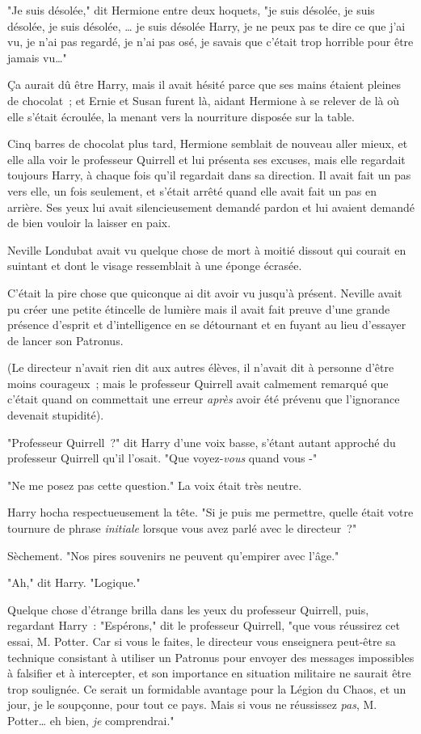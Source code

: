 "Je suis désolée," dit Hermione entre deux hoquets, "je suis désolée, je suis désolée, je suis désolée, … je suis désolée Harry, je ne peux pas te dire ce que j'ai vu, je n'ai pas regardé, je n'ai pas osé, je savais que c'était trop horrible pour être jamais vu…"

Ça aurait dû être Harry, mais il avait hésité parce que ses mains étaient pleines de chocolat~; et Ernie et Susan furent là, aidant Hermione à se relever de là où elle s'était écroulée, la menant vers la nourriture disposée sur la table.

Cinq barres de chocolat plus tard, Hermione semblait de nouveau aller mieux, et elle alla voir le professeur Quirrell et lui présenta ses excuses, mais elle regardait toujours Harry, à chaque fois qu'il regardait dans sa direction. Il avait fait un pas vers elle, un fois seulement, et s'était arrêté quand elle avait fait un pas en arrière. Ses yeux lui avait silencieusement demandé pardon et lui avaient demandé de bien vouloir la laisser en paix.

\later

Neville Londubat avait vu quelque chose de mort à moitié dissout qui courait en suintant et dont le visage ressemblait à une éponge écrasée.

C'était la pire chose que quiconque ai dit avoir vu jusqu'à présent. Neville avait pu créer une petite étincelle de lumière mais il avait fait preuve d'une grande présence d'esprit et d'intelligence en se détournant et en fuyant au lieu d'essayer de lancer son Patronus.

(Le directeur n'avait rien dit aux autres élèves, il n'avait dit à personne d'être moins courageux~; mais le professeur Quirrell avait calmement remarqué que c'était quand on commettait une erreur \emph{après} avoir été prévenu que l'ignorance devenait stupidité).

"Professeur Quirrell~?" dit Harry d'une voix basse, s'étant autant approché du professeur Quirrell qu'il l'osait. "Que voyez-\emph{vous} quand vous -"

"Ne me posez pas cette question." La voix était très neutre.

Harry hocha respectueusement la tête. "Si je puis me permettre, quelle était votre tournure de phrase \emph{initiale} lorsque vous avez parlé avec le directeur~?"

Sèchement. "Nos pires souvenirs ne peuvent qu'empirer avec l'âge."

"Ah," dit Harry. "Logique."

Quelque chose d'étrange brilla dans les yeux du professeur Quirrell, puis, regardant Harry~: "Espérons," dit le professeur Quirrell, "que vous réussirez cet essai, M. Potter. Car si vous le faites, le directeur vous enseignera peut-être sa technique consistant à utiliser un Patronus pour envoyer des messages impossibles à falsifier et à intercepter, et son importance en situation militaire ne saurait être trop soulignée. Ce serait un formidable avantage pour la Légion du Chaos, et un jour, je le soupçonne, pour tout ce pays. Mais si vous ne réussissez \emph{pas}, M. Potter… eh bien, \emph{je} comprendrai."


